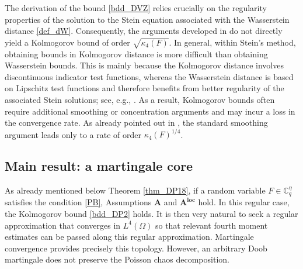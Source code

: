 \documentclass[ECP,preprint]{ejpecp}
\newcommand{\bC}{\mathbb{C}^\eta}
\begin{document}
The derivation of the bound \eqref{bdd_DVZ} relies crucially on
 the regularity properties of the solution to the Stein equation 
 associated with the Wasserstein distance \eqref{def_dW}. 
 Consequently, the arguments developed in \cite{DVZ18} 
 do not directly yield a Kolmogorov bound of order $\sqrt{\kappa_4(F)}$. 
In general, within Stein's method, obtaining bounds in
Kolmogorov distance is   more difficult than obtaining
Wasserstein bounds.  This is mainly because the Kolmogorov distance
involves discontinuous indicator test functions, whereas the
Wasserstein distance is based on Lipschitz test functions and therefore
benefits from better regularity of the associated Stein solutions; see,
e.g., \cite{CGS11}.  As a result, Kolmogorov bounds often
require additional smoothing or concentration arguments and may incur
a loss in the convergence rate.
As already pointed out in \cite[Rem.~1.4]{DVZ18}, 
 the standard smoothing argument leads only to a rate of order $\kappa_4(F)^{1/4}$.




 

\subsection{Main result: \textsf{a martingale core}} \label{SEC_12}

As already mentioned below Theorem \ref{thm_DP18},
if a random variable $F\in\bC_q$ satisfies the condition \eqref{PB},
Assumptions $\mathbf{A}$ and $\mathbf{A}^{\textbf{loc}}$
hold. In this regular case, the Kolmogorov bound \eqref{bdd_DP2} holds.
It is then very natural to seek  a regular approximation
 that converges in $L^4(\Omega)$
 so that relevant fourth moment estimates can be passed along 
 this regular approximation. 
Martingale convergence provides precisely this topology.  
However, an arbitrary Doob martingale does not preserve the Poisson chaos
decomposition. 
\end{document}
